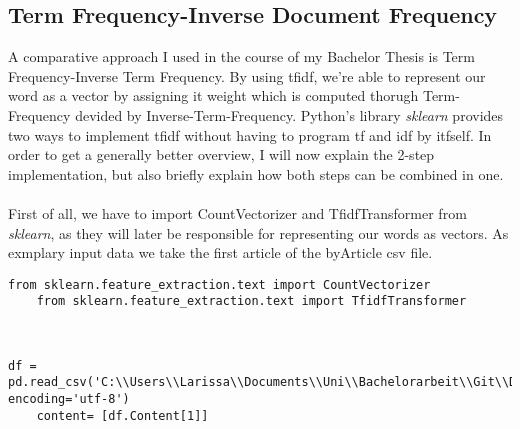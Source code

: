 \documentclass[a4paper, 11pt,titlepage,oneside,openany]{book}
\begin{document}
\subsection{Term Frequency-Inverse Document Frequency}
A comparative approach I used in the course of my Bachelor Thesis is Term Frequency-Inverse Term Frequency. By using \gls{tfidf}, we're able to represent our word as a vector by assigning it weight which is computed thorugh Term-Frequency devided by Inverse-Term-Frequency. Python's library \textit{sklearn} provides two ways to implement \gls{tfidf} without having to program \gls{tf} and \gls{idf} by itfself.
In order to get a generally better overview, I will now explain the 2-step implementation, but also briefly explain how both steps can be combined in one. \\
\\ First of all, we have to import CountVectorizer and TfidfTransformer from \textit{sklearn}, as they will later be responsible for representing our words as vectors. 
As exmplary input data we take the first article of the byArticle csv file. \\
\noindent
\begin{minipage}{\linewidth}
	\begin{lstlisting}[frame=single]
	from sklearn.feature_extraction.text import CountVectorizer
	from sklearn.feature_extraction.text import TfidfTransformer
	\end{lstlisting}
\end{minipage}\\
\noindent
\begin{minipage}[c]{\linewidth}
	\begin{lstlisting}[frame=single]
	df = pd.read_csv('C:\\Users\\Larissa\\Documents\\Uni\\Bachelorarbeit\\Git\\Data\\Preprocessed_ByArticle.csv', encoding='utf-8')
	content= [df.Content[1]]
	\end{lstlisting}
\end{minipage} \\
\noindent
\end{document}
